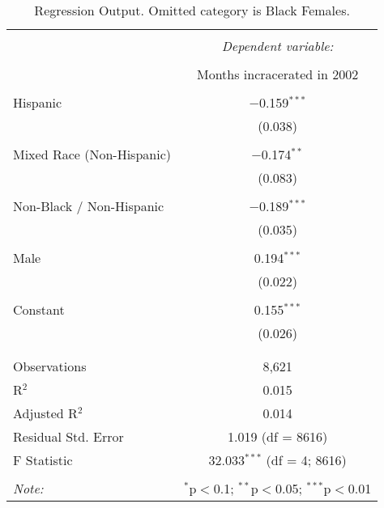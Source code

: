 
\begin{table}[!htbp] \centering 
  \caption{Regression Output. Omitted category is Black Females.} 
  \label{tab:regression} 
\begin{tabular}{@{\extracolsep{5pt}}lc} 
\\[-1.8ex]\hline 
\hline \\[-1.8ex] 
 & \multicolumn{1}{c}{\textit{Dependent variable:}} \\ 
\cline{2-2} 
\\[-1.8ex] & Months incracerated in 2002 \\ 
\hline \\[-1.8ex] 
 Hispanic & $-$0.159$^{***}$ \\ 
  & (0.038) \\ 
  & \\ 
 Mixed Race (Non-Hispanic) & $-$0.174$^{**}$ \\ 
  & (0.083) \\ 
  & \\ 
 Non-Black / Non-Hispanic & $-$0.189$^{***}$ \\ 
  & (0.035) \\ 
  & \\ 
 Male & 0.194$^{***}$ \\ 
  & (0.022) \\ 
  & \\ 
 Constant & 0.155$^{***}$ \\ 
  & (0.026) \\ 
  & \\ 
\hline \\[-1.8ex] 
Observations & 8,621 \\ 
R$^{2}$ & 0.015 \\ 
Adjusted R$^{2}$ & 0.014 \\ 
Residual Std. Error & 1.019 (df = 8616) \\ 
F Statistic & 32.033$^{***}$ (df = 4; 8616) \\ 
\hline 
\hline \\[-1.8ex] 
\textit{Note:}  & \multicolumn{1}{r}{$^{*}$p$<$0.1; $^{**}$p$<$0.05; $^{***}$p$<$0.01} \\ 
\end{tabular} 
\end{table} 
